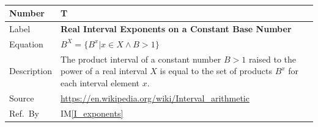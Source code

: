 \documentclass[12pt]{article}
\newcommand{\colAwidth}{0.13\textwidth}
\newcommand{\colBwidth}{0.82\textwidth}
\newcounter{theorynum} %
\newcommand{\iref}[1]{IM\ref{#1}}
\begin{document}

~\newline

\noindent
\begin{minipage}{\textwidth}
	\renewcommand*{\arraystretch}{1.5}
	\begin{tabular}{| p{\colAwidth} | p{\colBwidth}|}
		\hline
		\rowcolor[gray]{0.9}
		Number& T{theorynum}\thetheorynum 
		\label{T_exponents}\\
		\hline
		Label&\bf Real Interval Exponents on a Constant Base Number\\
		\hline
		Equation&  $B^X = \{B^x | x \in X \wedge B > 1\}$\\
		\hline
		Description & The product interval of a constant number $B > 1$ raised 
		to the power of a real interval $X$ is equal to the set of products 
		$B^x$ for each interval element $x$.\\
		\hline
		Source & \url{https://en.wikipedia.org/wiki/Interval_arithmetic}\\
		\hline
		Ref.\ By & \iref{I_exponents}\\
		\hline
	\end{tabular}
\end{minipage}\\

~\newline
\end{document}
